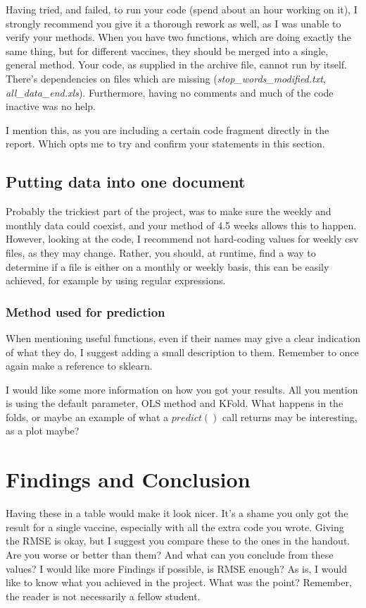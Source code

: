 \documentclass[11pt]{article} %
\begin{document}
Having tried, and failed, to run your code (spend about an hour working on it), I strongly recommend you give it a thorough rework as well, as I was unable to verify your methods. When you have two functions, which are doing exactly the same thing, but for different vaccines, they should be merged into a single, general method. Your code, as supplied in the archive file, cannot run by itself. There's dependencies on files which are missing (\textit{stop\_words\_modified.txt}, \textit{all\_data\_end.xls}). Furthermore, having no comments and much of the code inactive was no help.

I mention this, as you are including a certain code fragment directly in the report. Which opts me to try and confirm your statements in this section.

\subsection*{Putting data into one document}
Probably the trickiest part of the project, was to make sure the weekly and monthly data could coexist, and your method of 4.5 weeks allows this to happen. However, looking at the code, I recommend not hard-coding values for weekly csv files, as they may change. Rather, you should, at runtime, find a way to determine if a file is either on a monthly or weekly basis, this can be easily achieved, for example by using regular expressions.

\subsubsection*{Method used for prediction}
When mentioning useful functions, even if their names may give a clear indication of what they do, I suggest adding a small description to them. Remember to once again make a reference to sklearn.

I would like some more information on how you got your results. All you mention is using the default parameter, OLS method and KFold. What happens in the folds, or maybe an example of what a $predict()$ call returns may be interesting, as a plot maybe?

\section*{Findings and Conclusion}
Having these in a table would make it look nicer. It's a shame you only got the result for a single vaccine, especially with all the extra code you wrote.
Giving the RMSE is okay, but I suggest you compare these to the ones in the handout. Are you worse or better than them? And what can you conclude from these values? I would like more Findings if possible, is RMSE enough? As is, I would like to know what you achieved in the project. What was the point? Remember, the reader is not necessarily a fellow student.
\end{document}
